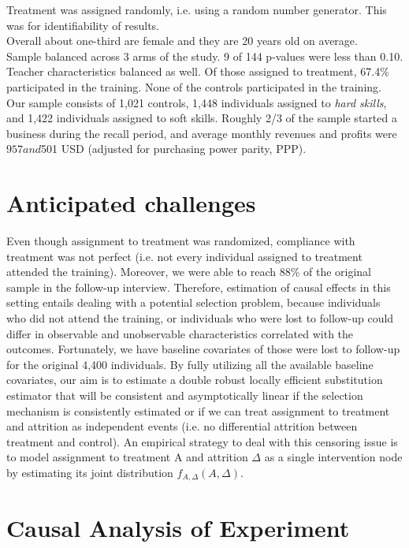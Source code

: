 \documentclass[oneside, notitlepage]{book}
\begin{document}
Treatment was assigned randomly, i.e. using a random number generator. This was for identifiability of results.\\

Overall about one-third are female and they are 20 years old on average.\\

Sample balanced across 3 arms of the study. 9 of 144 p-values were less than 0.10. Teacher characteristics balanced as well. Of those assigned to treatment, 67.4\% participated in the training. None of the controls participated in the training. Our sample consists of 1,021 controls, 1,448 individuals assigned to \textit{hard skills}, and 1,422 individuals assigned to soft skills. Roughly 2/3 of the sample started a business during the recall period, and average monthly revenues and profits were $957 and $501 USD (adjusted for purchasing power parity, PPP).\\


\section{Anticipated challenges}
\label{sec:antic-chall}

Even though assignment to treatment was randomized, compliance with treatment was not perfect (i.e. not every individual assigned to treatment attended the training). Moreover, we were able to reach 88\% of the original sample in the follow-up interview. Therefore, estimation of causal effects in this setting entails dealing with a potential selection problem, because individuals who did not attend the training, or individuals who were lost to follow-up could differ in observable and unobservable characteristics correlated with the outcomes. Fortunately, we have baseline covariates of those were lost to follow-up for the original 4,400 individuals. By fully utilizing all the available baseline covariates, our aim is to estimate a double robust locally efficient substitution estimator that will be consistent and asymptotically linear if the selection mechanism is consistently estimated or if we can treat assignment to treatment and attrition as independent events (i.e. no differential attrition between treatment and control).\cite{nano1} 
An empirical strategy to deal with this censoring issue is to model assignment to treatment A and attrition $\Delta$ as a single intervention node by estimating its joint distribution $f_{A,\Delta}(A,\Delta)$.


\section{Causal Analysis of Experiment}
\label{sec:caus-analys-exper}
\end{document}
